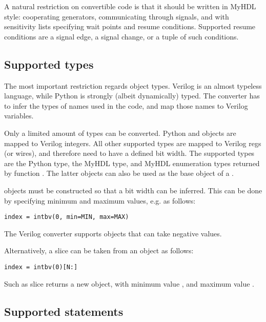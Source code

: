 A natural restriction on convertible code is that it should be
written in MyHDL style: cooperating generators, communicating through
signals, and with sensitivity lists specifying wait points and resume
conditions.  Supported resume conditions are a signal edge, a signal
change, or a tuple of such conditions.

\subsection{Supported types\label{conv-subset-types}}

The most important restriction regards object types. Verilog is an
almost typeless language, while Python is strongly (albeit
dynamically) typed. The converter has to infer the types of names
used in the code, and map those names to Verilog variables.

Only a limited amount of types can be converted.
Python  and  objects are mapped to Verilog
integers. All other supported types are mapped to Verilog regs (or
wires), and therefore need to have a defined bit width. The supported
types are the Python  type, the MyHDL  type,
and MyHDL enumeration types returned by function . The
latter objects can also be used as the base object of a
. 

 objects must be constructed so that a bit
width can be inferred. This can be done by specifying minimum
and maximum values, e.g. as follows:

\begin{verbatim}
index = intbv(0, min=MIN, max=MAX)
\end{verbatim}

The Verilog converter supports  objects that
can take negative values.

Alternatively, a slice can be taken from an  object
as follows:

\begin{verbatim}
index = intbv(0)[N:]
\end{verbatim}

Such as slice returns a new  object, with minimum
value  , and maximum value .


\subsection{Supported statements\label{conv-subset-statements}}

